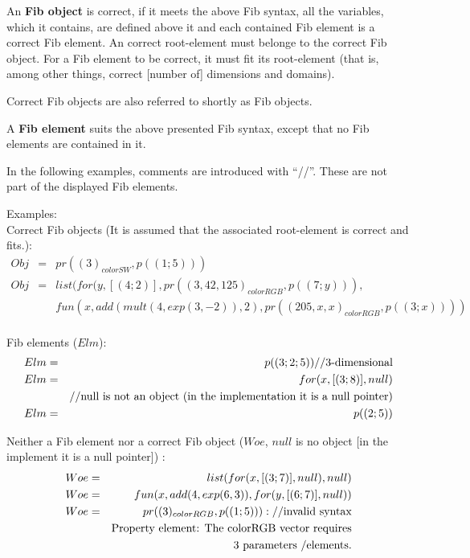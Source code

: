 An \textbf{Fib object} is correct, if it meets the above Fib syntax, all the variables, which it contains, are defined above it and each contained Fib element is a correct Fib element. An correct root-element must belonge to the correct Fib object. For a Fib element to be correct, it must fit its root-element (that is, among other things, correct [number of] dimensions and domains).

Correct Fib objects are also referred to shortly as Fib objects.

\bigskip\noindent
A \textbf{Fib element} suits the above presented Fib syntax, except that no Fib elements are contained in it.

\bigskip\noindent
In the following examples, comments are introduced with ``//''. These are not part of the displayed Fib elements.

\begin{flushleft}
Examples:\\
Correct Fib objects (It is assumed that the associated root-element is correct and fits.):
\begin{eqnarray*}
Obj &=& pr( (3)_{colorSW}, p((1;5)))\\
Obj &=& list( for(y,[(4;2)], pr( (3, 42, 125)_{colorRGB} , p((7;y))), \\
&& fun(x,add( mult(4, exp( 3, -2)), 2 ), pr( (205, x ,x)_{colorRGB}, p((3;x)) ) )\\
\end{eqnarray*}

Fib elements ($Elm$):
\begin{eqnarray*}
Elm &=& p((3;2;5)) \textnormal{//3-dimensional}\\
Elm &=& for(x,[(3;8)],null) \\
& & \textnormal{//null is not an object (in the implementation it is a null pointer)}\\
Elm &=& p((2;5))\\
\end{eqnarray*}

Neither a Fib element nor a correct Fib object ($Woe$, $null$ is no object [in the implement it is a null pointer]) :\\
\begin{eqnarray*}
Woe &=& list( for( x, [(3;7)], null), null)\\
Woe &=& fun( x, add(4, exp(6, 3) ) , for(y, [(6;7)], null))\\
Woe &=& pr( (3)_{colorRGB}, p((1;5)) ): \textnormal{//invalid syntax} \\
&& \textnormal{Property element: The colorRGB vector requires}\\
&& \textnormal{3 parameters /elements.}\\
\end{eqnarray*}

\end{flushleft}


